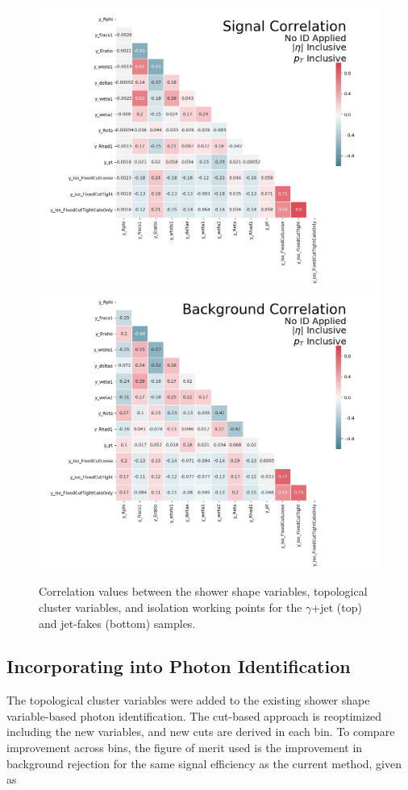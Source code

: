 \begin{figure}[!hp]
    \centering
    \includegraphics[width=.77\textwidth]{chapters/chapter4_photonID/images/sig_none_corr.png}
    \includegraphics[width=.77\textwidth]{chapters/chapter4_photonID/images/bkg_none_corr.png}
    \caption[Correlation values between the shower shape variables, topological cluster variables, and isolation working points for the $\gamma$+jet and jet-fakes sample] {Correlation values between the shower shape variables, topological cluster variables, and isolation working points for the $\gamma$+jet (top) and jet-fakes (bottom) samples.}
    \label{fig:photonid-corrs}
\end{figure}

\subsection{Incorporating into Photon Identification}

The topological cluster variables were added to the existing shower shape variable-based photon identification. The cut-based approach is reoptimized including the new variables, and new cuts are derived in each \etaPt bin. To compare improvement across bins, the figure of merit used is the improvement in background rejection for the same signal efficiency as the current method, given as

